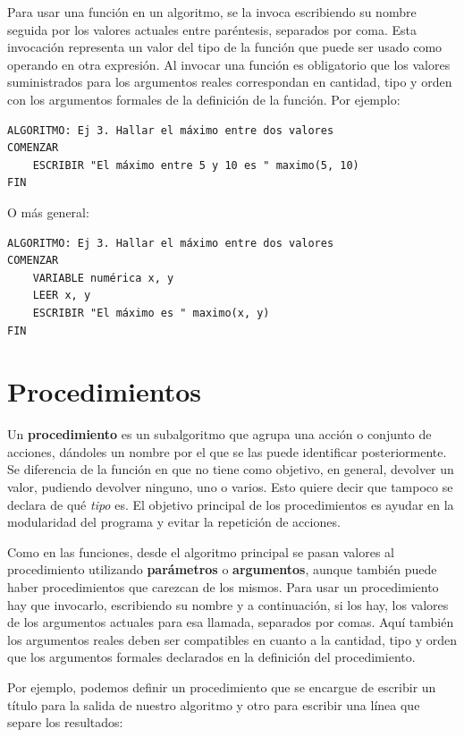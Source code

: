 \documentclass[]{book}
\begin{document}
Para usar una función en un algoritmo, se la invoca escribiendo su nombre seguida por los valores actuales entre paréntesis, separados por coma. Esta invocación representa un valor del tipo de la función que puede ser usado como operando en otra expresión. Al invocar una función es obligatorio que los valores suministrados para los argumentos reales correspondan en cantidad, tipo y orden con los argumentos formales de la definición de la función. Por ejemplo:

\begin{verbatim}
ALGORITMO: Ej 3. Hallar el máximo entre dos valores
COMENZAR
    ESCRIBIR "El máximo entre 5 y 10 es " maximo(5, 10)
FIN
\end{verbatim}

O más general:

\begin{verbatim}
ALGORITMO: Ej 3. Hallar el máximo entre dos valores
COMENZAR
    VARIABLE numérica x, y
    LEER x, y
    ESCRIBIR "El máximo es " maximo(x, y)
FIN
\end{verbatim}

\hypertarget{procedimientos}{%
\section{Procedimientos}\label{procedimientos}}

Un \textbf{procedimiento} es un subalgoritmo que agrupa una acción o conjunto de acciones, dándoles un nombre por el que se las puede identificar posteriormente. Se diferencia de la función en que no tiene como objetivo, en general, devolver un valor, pudiendo devolver ninguno, uno o varios. Esto quiere decir que tampoco se declara de qué \emph{tipo} es. El objetivo principal de los procedimientos es ayudar en la modularidad del programa y evitar la repetición de acciones.

Como en las funciones, desde el algoritmo principal se pasan valores al procedimiento utilizando \textbf{parámetros} o \textbf{argumentos}, aunque también puede haber procedimientos que carezcan de los mismos. Para usar un procedimiento hay que invocarlo, escribiendo su nombre y a continuación, si los hay, los valores de los argumentos actuales para esa llamada, separados por comas. Aquí también los argumentos reales deben ser compatibles en cuanto a la cantidad, tipo y orden que los argumentos formales declarados en la definición del procedimiento.

Por ejemplo, podemos definir un procedimiento que se encargue de escribir un título para la salida de nuestro algoritmo y otro para escribir una línea que separe los resultados:
\end{document}
